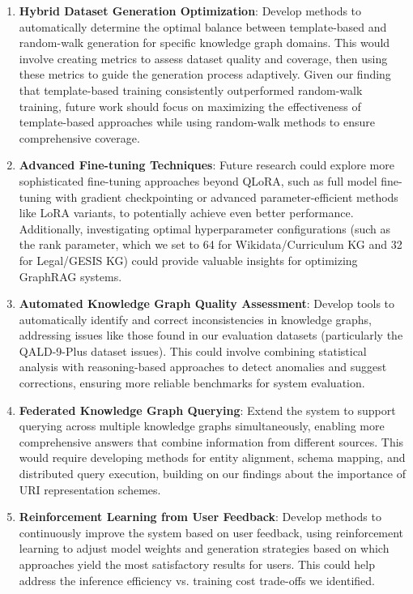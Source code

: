 \begin{enumerate}
    \item \textbf{Hybrid Dataset Generation Optimization}: Develop methods to automatically determine the optimal balance between template-based and random-walk generation for specific knowledge graph domains. This would involve creating metrics to assess dataset quality and coverage, then using these metrics to guide the generation process adaptively. Given our finding that template-based training consistently outperformed random-walk training, future work should focus on maximizing the effectiveness of template-based approaches while using random-walk methods to ensure comprehensive coverage.
    
    \item \textbf{Advanced Fine-tuning Techniques}: Future research could explore more sophisticated fine-tuning approaches beyond QLoRA, such as full model fine-tuning with gradient checkpointing or advanced parameter-efficient methods like LoRA variants, to potentially achieve even better performance. Additionally, investigating optimal hyperparameter configurations (such as the rank parameter, which we set to 64 for Wikidata/Curriculum KG and 32 for Legal/GESIS KG) could provide valuable insights for optimizing GraphRAG systems.
    
    \item \textbf{Automated Knowledge Graph Quality Assessment}: Develop tools to automatically identify and correct inconsistencies in knowledge graphs, addressing issues like those found in our evaluation datasets (particularly the QALD-9-Plus dataset issues). This could involve combining statistical analysis with reasoning-based approaches to detect anomalies and suggest corrections, ensuring more reliable benchmarks for system evaluation.
    
    \item \textbf{Federated Knowledge Graph Querying}: Extend the system to support querying across multiple knowledge graphs simultaneously, enabling more comprehensive answers that combine information from different sources. This would require developing methods for entity alignment, schema mapping, and distributed query execution, building on our findings about the importance of URI representation schemes.
    
    \item \textbf{Reinforcement Learning from User Feedback}: Develop methods to continuously improve the system based on user feedback, using reinforcement learning to adjust model weights and generation strategies based on which approaches yield the most satisfactory results for users. This could help address the inference efficiency vs. training cost trade-offs we identified.
    

\end{enumerate}
